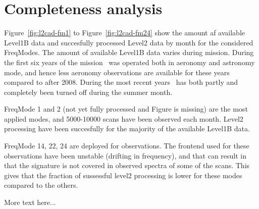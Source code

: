 \chapter{Completeness analysis}
\label{chapter:cad}

Figure~\ref{fig:l2cad-fm1} to Figure~\ref{fig:l2cad-fm24}
show the amount af available Level1B data and succesfully
processed Level2 data by month for the considered FreqModes.
The amount of available Level1B data varies during mission.
During the first six years of the mission \smr\ was operated
both in aeronomy and astronomy mode, and hence less
aeronomy observations are available for these years
compared to after 2008.  
During the most recent years \smr\ has both partly and completely
been turned off during the summer month.

FreqMode 1 and 2 (not yet fully processed and Figure is missing)
are the most applied modes, and 5000-10000 scans have been
observed each month. Level2 processing have been succesfully
for the majority of the available Level1B data.

FreqMode 14, 22, 24 are deployed for  observations.
The frontend used for these observations have been unstable
(drifting in frequency), and that can result in that the 
 signature is not covered in observed spectra 
of some of the scans. This gives that the fraction of
sussessful level2 processing is lower for these modes
compared to the others.
 
More text here...




